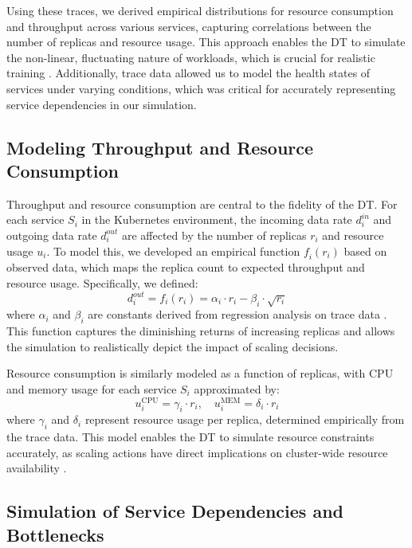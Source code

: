 \documentclass[conference]{IEEEtran}
\begin{document}
Using these traces, we derived empirical distributions for resource consumption and throughput across various services, capturing correlations between the number of replicas and resource usage. This approach enables the DT to simulate the non-linear, fluctuating nature of workloads, which is crucial for realistic training \cite{nguyen_sim2reality}. Additionally, trace data allowed us to model the health states of services under varying conditions, which was critical for accurately representing service dependencies in our simulation.

\subsection{Modeling Throughput and Resource Consumption}

Throughput and resource consumption are central to the fidelity of the DT. For each service $S_i$ in the Kubernetes environment, the incoming data rate $\mathit{d_i^{in}}$ and outgoing data rate $\mathit{d_i^{out}}$ are affected by the number of replicas $\mathit{r_i}$ and resource usage $\mathit{u_i}$. To model this, we developed an empirical function $\mathit{f_i(r_i)}$ based on observed data, which maps the replica count to expected throughput and resource usage. Specifically, we defined:
\begin{equation}
    d_i^{out} = f_i(r_i) = \alpha_i \cdot r_i - \beta_i \cdot \sqrt{r_i}
\end{equation}
where $\alpha_i$ and $\beta_i$ are constants derived from regression analysis on trace data \cite{tan_nn_resource_approx}. This function captures the diminishing returns of increasing replicas and allows the simulation to realistically depict the impact of scaling decisions.

Resource consumption is similarly modeled as a function of replicas, with CPU and memory usage for each service $S_i$ approximated by:
\begin{equation}
    u_i^{\text{CPU}} = \gamma_i \cdot r_i, \quad u_i^{\text{MEM}} = \delta_i \cdot r_i
\end{equation}
where $\gamma_i$ and $\delta_i$ represent resource usage per replica, determined empirically from the trace data. This model enables the DT to simulate resource constraints accurately, as scaling actions have direct implications on cluster-wide resource availability \cite{schleich_digital_twin}.

\subsection{Simulation of Service Dependencies and Bottlenecks}
\end{document}
